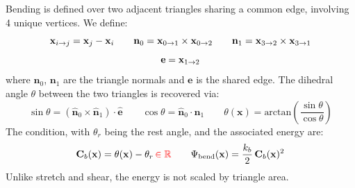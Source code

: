 \documentclass{article}
\newcommand{\drop}[1]{\textcolor{red}{#1}}
\begin{document}
Bending is defined over two adjacent triangles sharing a common edge, involving 4 unique vertices. We define:
\begin{equation*}
    \mathbf{x}_{i \rightarrow j} = \mathbf{x}_j - \mathbf{x}_i
    \qquad
    \mathbf{n}_0 = \mathbf{x}_{0 \rightarrow 1} \times \mathbf{x}_{0 \rightarrow 2}
    \qquad
    \mathbf{n}_1 = \mathbf{x}_{3 \rightarrow 2} \times \mathbf{x}_{3 \rightarrow 1}
\end{equation*}
\begin{equation*}
    \mathbf{e} = \mathbf{x}_{1 \rightarrow 2}
\end{equation*}
where $\mathbf{n}_0$, $\mathbf{n}_1$ are the triangle normals and $\mathbf{e}$ 
is the shared edge. The dihedral angle $\theta$ between the two triangles 
is recovered via:
\begin{equation}
    \sin\theta = (\hat{\mathbf{n}}_0 \times \hat{\mathbf{n}}_1)\cdot\hat{\mathbf{e}}
    \qquad
    \cos\theta = \hat{\mathbf{n}}_0 \cdot \hat{\mathbf{n}}_1
    \qquad
    \theta(\mathbf{x}) = \text{arctan}\left(\frac{\sin\theta}{\cos\theta}\right)
\end{equation}
The condition, with $\theta_r$ being the rest angle, and the associated 
energy are:
\begin{equation}
    \mathbf{C}_b(\mathbf{x}) = \theta(\mathbf{x}) - \theta_r
    \, \drop{\in \mathbb{R}}
    \qquad
    \Psi_{\text{bend}}(\mathbf{x}) = \frac{k_b}{2}\,\mathbf{C}_b(\mathbf{x})^2
\end{equation}
Unlike stretch and shear, the energy is not scaled by triangle area.
\end{document}
